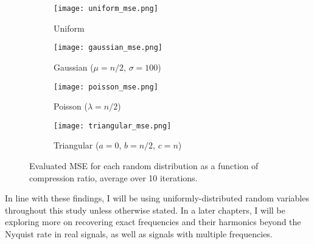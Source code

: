 \begin{figure}[htb]
	\centering
	\begin{subfigure}[h!]{0.49\textwidth}
		\centering
		\texttt{[image: uniform\_mse.png]}
		\caption{Uniform}
		\label{fig:random-mse-uniform}
	\end{subfigure}
	\begin{subfigure}[h!]{0.49\textwidth}
		\centering
		\texttt{[image: gaussian\_mse.png]}
		\caption{Gaussian ($\mu = n/2$, $\sigma = 100$)}
		\label{fig:random-mse-gaussian}
	\end{subfigure}
	\begin{subfigure}[h!]{0.49\textwidth}
		\centering
		\texttt{[image: poisson\_mse.png]}
		\caption{Poisson ($\lambda = n/2$)}
		\label{fig:random-mse-poisson}
	\end{subfigure}
	\begin{subfigure}[h!]{0.49\textwidth}
		\centering
		\texttt{[image: triangular\_mse.png]}
		\caption{Triangular ($a = 0$, $b = n/2$, $c = n$)}
		\label{fig:random-mse-triangular}
	\end{subfigure}
	\caption{Evaluated MSE for each random distribution as a function of compression ratio, average over 10 iterations.}
	\label{fig:random-mse}
\end{figure}

In line with these findings, I will be using uniformly-distributed random variables throughout this study unless otherwise stated. In a later chapters, I will be exploring more on recovering exact frequencies and their harmonics beyond the Nyquist rate in real signals, as well as signals with multiple frequencies.